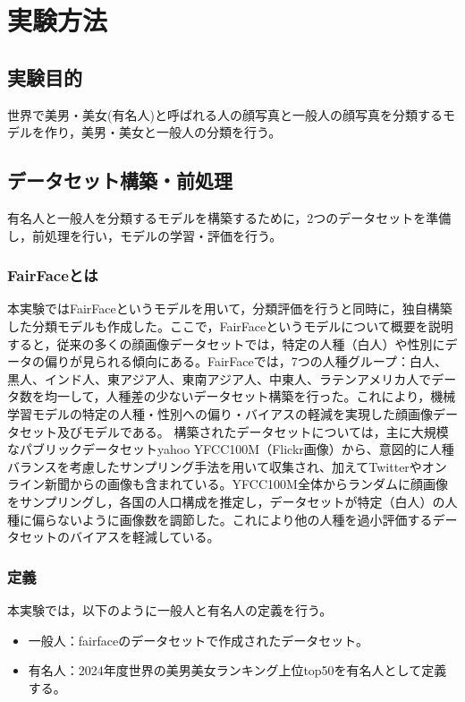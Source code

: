 \documentclass[a4paper,11pt,titlepage]{jsarticle}
\begin{document}
\section{実験方法}
\subsection{実験目的}
世界で美男・美女(有名人)と呼ばれる人の顔写真と一般人の顔写真を分類するモデルを作り，美男・美女と一般人の分類を行う。

\subsection{データセット構築・前処理}
有名人と一般人を分類するモデルを構築するために，2つのデータセットを準備し，前処理を行い，モデルの学習・評価を行う。

\subsubsection{FairFaceとは}
本実験ではFairFaceというモデルを用いて，分類評価を行うと同時に，独自構築した分類モデルも作成した。ここで，FairFaceというモデルについて概要を説明すると，従来の多くの顔画像データセットでは，特定の人種（白人）や性別にデータの偏りが見られる傾向にある。FairFaceでは，7つの人種グループ：白人、黒人、インド人、東アジア人、東南アジア人、中東人、ラテンアメリカ人でデータ数を均一して，人種差の少ないデータセット構築を行った。これにより，機械学習モデルの特定の人種・性別への偏り・バイアスの軽減を実現した顔画像データセット及びモデルである。
構築されたデータセットについては，主に大規模なパブリックデータセットyahoo YFCC100M（Flickr画像）から、意図的に人種バランスを考慮したサンプリング手法を用いて収集され、加えてTwitterやオンライン新聞からの画像も含まれている。YFCC100M全体からランダムに顔画像をサンプリングし，各国の人口構成を推定し，データセットが特定（白人）の人種に偏らないように画像数を調節した。これにより他の人種を過小評価するデータセットのバイアスを軽減している。


\subsubsection{定義}
本実験では，以下のように一般人と有名人の定義を行う。
\begin{itemize}
    \item 一般人：fairfaceのデータセットで作成されたデータセット。
    \item 有名人：2024年度世界の美男美女ランキング上位top50を有名人として定義する。
\end{itemize}
\end{document}
